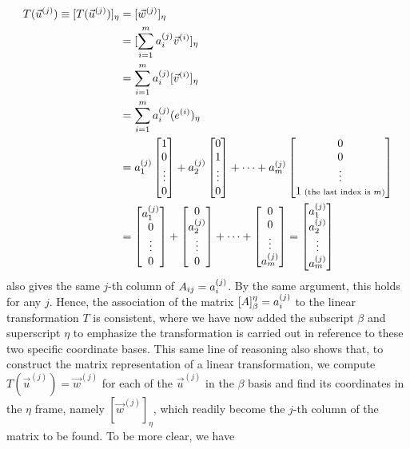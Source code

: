 \begin{align*}
T(\vec{u}^{(j)}) \equiv [T(\vec{u}^{(j)})]_\eta &= [\vec{w}^{(j)}]_\eta \\
&= [\sum_{i=1}^{m} a_i^{(j)}\vec{v}^{(i)}]_\eta \\
&= \sum_{i=1}^{m} a_i^{(j)}[\vec{v}^{(i)}]_\eta \\
&= \sum_{i=1}^{m} a_i^{(j)}(e^{(i)})_\eta \\
&=  a_1^{(j)} \begin{bmatrix}
1 \\
0 \\
\vdots \\
0
\end{bmatrix}
+
a_2^{(j)} \begin{bmatrix}
0 \\
1 \\
\vdots \\
0
\end{bmatrix}
+ \cdots
+
a_m^{(j)} \begin{bmatrix}
0 \\
0 \\
\vdots \\
1 {\scriptsize \text{ (the last index is $m$)}}
\end{bmatrix}
\\
&= \begin{bmatrix}
a_1^{(j)} \\
0 \\
\vdots \\
0
\end{bmatrix}
+
\begin{bmatrix}
0 \\
a_2^{(j)} \\
\vdots \\
0
\end{bmatrix}
+ \cdots
+
\begin{bmatrix}
0 \\
0 \\
\vdots \\
a_m^{(j)}
\end{bmatrix}
=
\begin{bmatrix}
a_1^{(j)} \\
a_2^{(j)} \\
\vdots \\
a_m^{(j)}
\end{bmatrix}
\end{align*}
also gives the same $j$-th column of $A_{ij} = \smash{a_i^{(j)}}$. By the same argument, this holds for any $j$. Hence, the association of the matrix $\smash{[A]_\beta^\eta} = \smash{a_i^{(j)}}$ to the linear transformation $T$ is consistent, where we have now added the subscript $\beta$ and superscript $\eta$ to emphasize the transformation is carried out in reference to these two specific coordinate bases. This same line of reasoning also shows that, to construct the matrix representation of a linear transformation, we compute $T(\vec{u}^{(j)}) = \vec{w}^{(j)}$ for each of the $\vec{u}^{(j)}$ in the $\mathcal{\beta}$ basis and find its coordinates in the $\mathcal{\eta}$ frame, namely $[\vec{w}^{(j)}]_\eta$, which readily become the $j$-th column of the matrix to be found. To be more clear, we have
